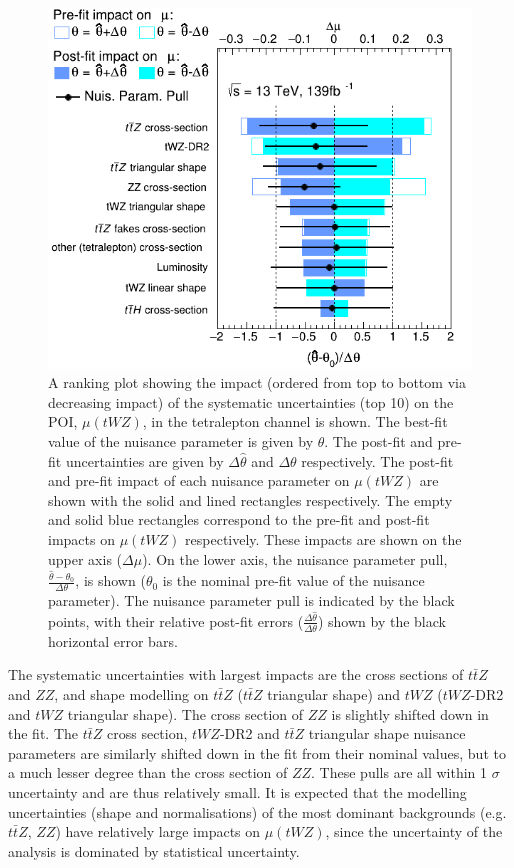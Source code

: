 \begin{figure}[h!]
\centering
    \includegraphics[width=.65\textwidth]{figures/PostFitPlots/RankingSysts_SigXsecOverSM_systs}
    \caption{A ranking plot showing the impact (ordered from top to bottom via decreasing impact) of the systematic uncertainties (top 10) on the POI, $\mu (tWZ)$, in the tetralepton channel is shown. The best-fit value of the nuisance parameter is given by $\hat{\theta}$. The post-fit and pre-fit uncertainties are given by $\Delta \hat{\theta}$ and $\Delta\theta$ respectively. The post-fit and pre-fit impact of each nuisance parameter on $\mu (tWZ)$ are shown with the solid and lined rectangles respectively. The empty and solid blue rectangles correspond to the pre-fit and post-fit impacts on $\mu (tWZ)$ respectively. These impacts are shown on the upper axis ($\Delta \mu$). On the lower axis, the nuisance parameter pull, $\frac{\hat{\theta} - \theta_{0}}{\Delta{\theta}}$, is shown ($\theta_{0}$ is the nominal pre-fit value of the nuisance parameter). The nuisance parameter pull is indicated by the black points, with their relative post-fit errors ($\frac{\Delta \hat{\theta}}{\Delta \theta}$) shown by the black horizontal error bars. }
  \label{fig:4lep-PostFit-nuisance-ranking}
\end{figure}The systematic uncertainties with largest impacts are the cross sections of $t\bar{t}Z$ and $ZZ$, and shape modelling on $t\bar{t}Z$ ($t\bar{t}Z$ triangular shape) and $tWZ$ ($tWZ$-DR2 and $tWZ$ triangular shape). The cross section of $ZZ$ is slightly shifted down in the fit. The $t\bar{t}Z$ cross section, $tWZ$-DR2 and $t\bar{t}Z$ triangular shape nuisance parameters are similarly shifted down in the fit from their nominal values, but to a much lesser degree than the cross section of $ZZ$. These pulls are all within 1 $\sigma$ uncertainty and are thus relatively small. It is expected that the modelling uncertainties (shape and normalisations) of the most dominant backgrounds (e.g. $t\bar{t}Z$, $ZZ$) have relatively large impacts on $\mu(tWZ)$, since the uncertainty of the analysis is dominated by statistical uncertainty.

